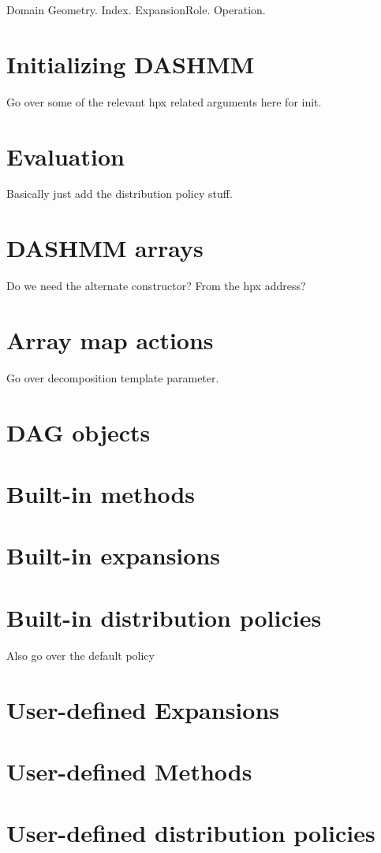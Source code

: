 Domain Geometry. Index. ExpansionRole. Operation.

\section{Initializing DASHMM}

Go over some of the relevant hpx related arguments here for init.

\section{Evaluation}

Basically just add the distribution policy stuff.

\section{DASHMM arrays}

Do we need the alternate constructor? From the hpx address?

\section{Array map actions}

Go over decomposition template parameter.

\section{DAG objects}

\section{Built-in methods}

\section{Built-in expansions}

\section{Built-in distribution policies}

Also go over the default policy

\section{User-defined Expansions}

\section{User-defined Methods}

\section{User-defined distribution policies}

